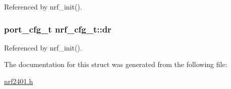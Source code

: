 Referenced by nrf\_\-init().\hypertarget{structnrf__cfg__t_64ed9f1b204e8c3e768d93bb0f0aa6ba}{
\subsubsection{\setlength{\rightskip}{0pt plus 5cm}port\_\-cfg\_\-t {\bf nrf\_\-cfg\_\-t::dr}}}
\label{structnrf__cfg__t_64ed9f1b204e8c3e768d93bb0f0aa6ba}




Referenced by nrf\_\-init().

The documentation for this struct was generated from the following file:\begin{CompactItemize}
\item 
\hyperlink{nrf2401_8h}{nrf2401.h}\end{CompactItemize}
